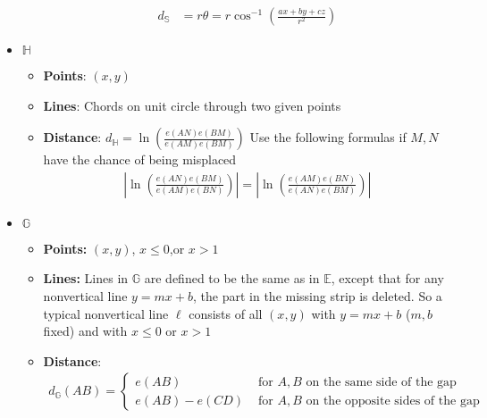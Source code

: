 \documentclass{report}
\begin{document}
\begin{itemize}
\begin{itemize}
                    \begin{align*}
                        d_{\mathbb{S}} &= r\theta = r\cos^{-1}{\left(\frac{ax+by+cz}{r^{2}}\right)}
                    \end{align*}
            \end{itemize}
        \item \textbf{$\mathbb{H}$}
            \begin{itemize}
                \item \textbf{Points}: $(x,y)$
                \item \textbf{Lines}: Chords on unit circle through two given points
                \item \textbf{Distance}: $d_{\mathbb{H}} = \ln{\left(\frac{e(AN)e(BM)}{e(AM)e(BM)}\right)}$
                    \bigbreak \noindent 
                    Use the following formulas if $M,N$ have the chance of being misplaced
                    \begin{align*}
                        \left\lvert \ln{\left(\frac{e(AN)e(BM)}{e(AM)e(BN)}\right)} \right\rvert = \left\lvert \ln{\left(\frac{e(AM)e(BN)}{e(AN)e(BM)}\right)} \right\rvert
                    \end{align*}
            \end{itemize}
        \item \textbf{$\mathbb{G}$}
            \begin{itemize}
                \item \textbf{Points:}   $(x,y)$, $x \leq 0$,or  $x > 1 $
                \item \textbf{Lines:} Lines in $\mathbb{G}$ are defined to be the same as in $\mathbb{E}$, except that for any nonvertical line $y=mx+b$, the part in the missing strip is deleted. So a typical nonvertical line $\ell$ consists of all $(x,y)$ with $y=mx+b$ ($m,b$ fixed) and with $x \leq 0$ or $x > 1$
                \item \textbf{Distance}: 
                    \begin{align*}
                        d_{\mathbb{G}}(AB) = \begin{cases}
                            e(AB) & \text{ for $A,B$ on the same side of the gap} \\     
                            e(AB) - e(CD) & \text{ for $A,B$ on the opposite sides of the gap} 
                        \end{cases}
                    \end{align*}
            \end{itemize}

\end{itemize}
\end{document}
